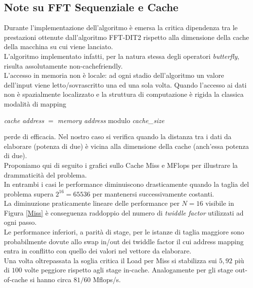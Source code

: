 \documentclass[12pt,a4paper,oneside,openright]{report}
\title{}
\begin{document}



\subsection{Note su FFT Sequenziale e Cache}
Durante l'implementazione dell'algoritmo è emersa la critica dipendenza tra le prestazioni ottenute dall'algoritmo FFT-DIT2 rispetto alla dimensione della cache della macchina su cui viene lanciato.\\
L'algoritmo implementato infatti, per la natura stessa degli operatori \emph{butterfly}, risulta assolutamente non-cachefriendly.\\
L'accesso in memoria non è locale: ad ogni stadio dell'algoritmo un valore dell'input viene letto/sovrascritto una ed una sola volta. Quando l'accesso ai dati non è spazialmente localizzato e la struttura di computazione è rigida la classica modalità di mapping\\
\begin{center}
\emph{cache address} $=$ \emph{memory address} modulo \emph{cache\_size} 
\end{center}
perde di efficacia. Nel nostro caso si verifica quando la distanza tra i dati da elaborare (potenza di due) è vicina alla dimensione della cache (anch'essa potenza di due).\\
Proponiamo qui di seguito i grafici sullo Cache Miss e MFlops per illustrare la drammaticità del problema.\\
In entrambi i casi le performance diminuiscono drasticamente quando la taglia del problema supera $2^{16}=65536$ per mantenersi successivamente costanti.\\ La diminuzione praticamente lineare delle performance per $N=16$ visibile in Figura \ref{Miss} è conseguenza raddoppio del numero di \emph{twiddle factor} utilizzati ad ogni passo.\\
Le performance inferiori, a parità di stage, per le istanze di taglia maggiore sono probabilmente dovute allo swap in/out dei twiddle factor il cui address mapping entra in conflitto con quello dei valori nel vettore da elaborare.\\
Una volta oltrepassata la soglia critica il Load per Miss si stabilizza sui $5,92$ più di $100$ volte peggiore rispetto agli stage in-cache. 
Analogamente per gli stage out-of-cache si hanno circa $81/60$ Mflops/s.
\end{document}
